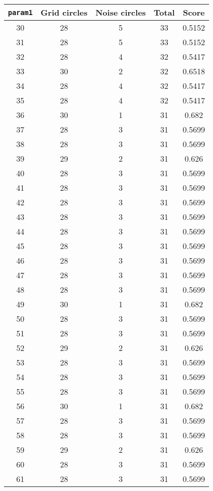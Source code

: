 \documentclass[letterpaper, 12pt]{article}
\begin{document}
\begin{longtable}{|c|c|c|c|c|}
\hline
\textbf{\texttt{param1}} & \textbf{Grid circles} & \textbf{Noise circles} & \textbf{Total} & \textbf{Score} \\
\hline
30 & 28 & 5 & 33 & 0.5152 \\
\hline
31 & 28 & 5 & 33 & 0.5152 \\
\hline
32 & 28 & 4 & 32 & 0.5417 \\
\hline
33 & 30 & 2 & 32 & 0.6518 \\
\hline
34 & 28 & 4 & 32 & 0.5417 \\
\hline
35 & 28 & 4 & 32 & 0.5417 \\
\hline
36 & 30 & 1 & 31 & 0.682 \\
\hline
37 & 28 & 3 & 31 & 0.5699 \\
\hline
38 & 28 & 3 & 31 & 0.5699 \\
\hline
39 & 29 & 2 & 31 & 0.626 \\
\hline
40 & 28 & 3 & 31 & 0.5699 \\
\hline
41 & 28 & 3 & 31 & 0.5699 \\
\hline
42 & 28 & 3 & 31 & 0.5699 \\
\hline
43 & 28 & 3 & 31 & 0.5699 \\
\hline
44 & 28 & 3 & 31 & 0.5699 \\
\hline
45 & 28 & 3 & 31 & 0.5699 \\
\hline
46 & 28 & 3 & 31 & 0.5699 \\
\hline
47 & 28 & 3 & 31 & 0.5699 \\
\hline
48 & 28 & 3 & 31 & 0.5699 \\
\hline
49 & 30 & 1 & 31 & 0.682 \\
\hline
50 & 28 & 3 & 31 & 0.5699 \\
\hline
51 & 28 & 3 & 31 & 0.5699 \\
\hline
52 & 29 & 2 & 31 & 0.626 \\
\hline
53 & 28 & 3 & 31 & 0.5699 \\
\hline
54 & 28 & 3 & 31 & 0.5699 \\
\hline
55 & 28 & 3 & 31 & 0.5699 \\
\hline
56 & 30 & 1 & 31 & 0.682 \\
\hline
57 & 28 & 3 & 31 & 0.5699 \\
\hline
58 & 28 & 3 & 31 & 0.5699 \\
\hline
59 & 29 & 2 & 31 & 0.626 \\
\hline
60 & 28 & 3 & 31 & 0.5699 \\
\hline
61 & 28 & 3 & 31 & 0.5699 \\

\end{longtable}
\end{document}
